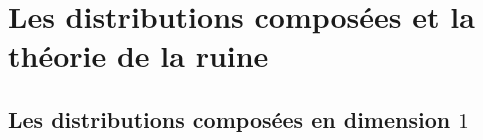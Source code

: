 \newpage
\newpage
\chapter{Les distributions composées et la théorie de la ruine}\label{Chapter1}
	\minitoc
	\newpage





\section{Les distributions composées en dimension $1$}\label{Chapter1Section1}

